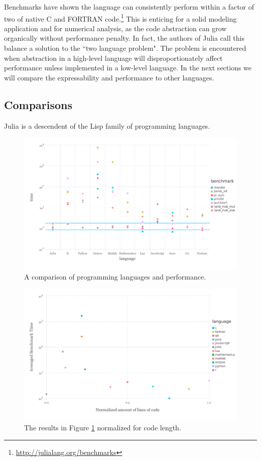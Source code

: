 \documentclass[a4paper]{article}
\begin{document}
Benchmarks have shown the language can consistently perform within a factor of
two of native C and FORTRAN code.\footnote{\url{http://julialang.org/benchmarks}}
This is enticing for a solid modeling application and for numerical analysis,
as the code abstraction can grow organically without performance penalty.
In fact, the authors of Julia call this balance a solution to the 
``two language problem". The problem is encountered when abstraction in a
high-level language will disproportionately affect performance unless
implemented in a low-level language. In the next sections we will compare
the expressability and performance to other languages.

\subsection{Comparisons}

Julia is a descendent of the Lisp family of programming languages.


\begin{figure}[h!]
  \centering
    \includegraphics[width=1.0\textwidth]{img/juliabench.pdf}
  \caption{A comparison of programming languages and performance.}
  \label{fig:juliabench}
\end{figure}

\begin{figure}[h!]
  \centering
    \includegraphics[width=1.0\textwidth]{img/expressability.pdf}
  \caption{The results in Figure \ref{fig:juliabench} normalized for code length.}
  \label{fig:juliaexpr}
\end{figure}
\end{document}
